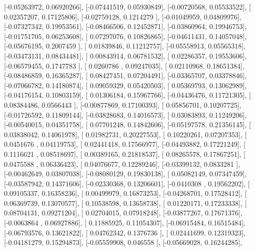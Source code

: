 \documentclass{article}
\begin{document}
       [-0.05263972,  0.06920266],
       [-0.07441519,  0.05930849],
       [-0.00720568,  0.05533522],
       [ 0.02357207,  0.17125806],
       [-0.02759128,  0.1214279 ],
       [-0.01049959,  0.04809976],
       [-0.07327342,  0.19953561],
       [-0.08466506,  0.12452871],
       [-0.03860964,  0.19946753],
       [-0.01751705,  0.06253608],
       [ 0.07297076,  0.10826865],
       [-0.04611431,  0.14057048],
       [-0.05676195,  0.2007459 ],
       [ 0.01839846,  0.11212757],
       [-0.05558913,  0.05565318],
       [-0.03473131,  0.08434481],
       [ 0.00843914,  0.06781532],
       [ 0.02286357,  0.19553606],
       [-0.06579455,  0.1747783 ],
       [ 0.0260786 ,  0.09247035],
       [ 0.02110968,  0.18651384],
       [-0.08486859,  0.16365287],
       [ 0.08427451,  0.07204491],
       [-0.03365707,  0.03378846],
       [-0.07066782,  0.14180874],
       [ 0.09059329,  0.05420503],
       [ 0.05369793,  0.13062989],
       [-0.04176154,  0.10803159],
       [ 0.01306184,  0.15967766],
       [-0.04436476,  0.11721305],
       [ 0.08384486,  0.0566443 ],
       [-0.00877869,  0.17100393],
       [ 0.05856701,  0.10207725],
       [-0.01726592,  0.11809144],
       [-0.03828683,  0.14016573],
       [ 0.03083893,  0.11249206],
       [-0.00540015,  0.04351758],
       [ 0.07701248,  0.14842606],
       [-0.05197578,  0.21356145],
       [ 0.03838042,  0.14061978],
       [ 0.01982731,  0.20227553],
       [ 0.10220261,  0.07207353],
       [ 0.0451676 ,  0.04119753],
       [ 0.02441418,  0.17566977],
       [-0.04493882,  0.17221249],
       [ 0.1116621 ,  0.08518697],
       [ 0.00389165,  0.21818537],
       [ 0.08265578,  0.17867251],
       [ 0.0475588 ,  0.06336423],
       [ 0.04076677,  0.12289246],
       [-0.03399132,  0.0833281 ],
       [-0.00462649,  0.03807038],
       [-0.08080129,  0.19830138],
       [ 0.05082149,  0.07347459],
       [-0.03587942,  0.14371606],
       [-0.02330368,  0.13206601],
       [-0.0410308 ,  0.19562202],
       [ 0.09105337,  0.16358236],
       [ 0.00499979,  0.16873253],
       [-0.04268701,  0.17528412],
       [ 0.06369739,  0.13070577],
       [ 0.10538598,  0.13658738],
       [ 0.01220171,  0.17233338],
       [ 0.08704131,  0.09271204],
       [ 0.02704015,  0.07918248],
       [-0.03877267,  0.17671376],
       [-0.0063864 ,  0.06927886],
       [ 0.11885925,  0.11054307],
       [-0.06915484,  0.16515484],
       [-0.06793576,  0.13621822],
       [ 0.04762342,  0.1376736 ],
       [ 0.02441699,  0.12319323],
       [-0.04181279,  0.15294873],
       [-0.05559908,  0.046558  ],
       [-0.05669028,  0.16244285],
\end{document}
